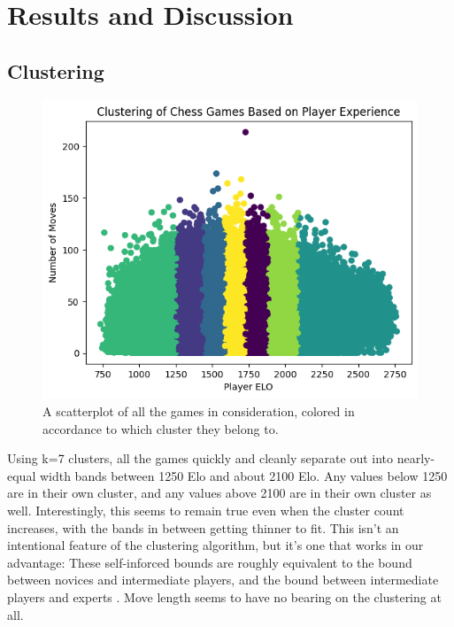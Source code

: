 \documentclass[conference]{IEEEtran}
\begin{document}
\section{Results and Discussion}

\subsection{Clustering}

\begin{figure}[htbp]
\centerline{\includegraphics[scale=0.5]{Clustering of Chess Games Based on Experience.png}}
\label{fig:cluster-results}
\caption{A scatterplot of all the games in consideration, colored in accordance to which cluster they belong to.}
\end{figure}

Using k=7 clusters, all the games quickly and cleanly separate out into nearly-equal width bands between 1250 Elo and about 2100 Elo. Any values below 1250 are in their own cluster, and any values above 2100 are in their own cluster as well. Interestingly, this seems to remain true even when the cluster count increases, with the bands in between getting thinner to fit. This isn't an intentional feature of the clustering algorithm, but it's one that works in our advantage: These self-inforced bounds are roughly equivalent to the bound between novices and intermediate players, and the bound between intermediate players and experts \cite{b6}. Move length seems to have no bearing on the clustering at all.
\end{document}
